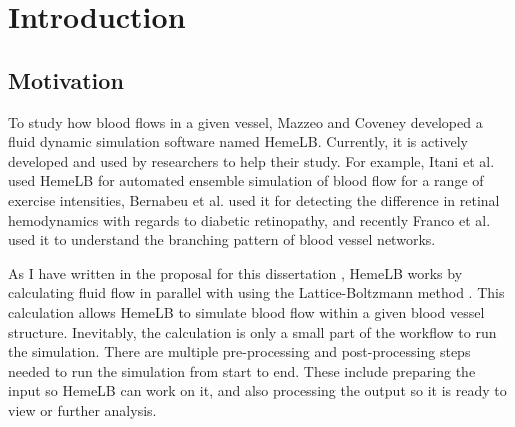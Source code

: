  

\chapter[Introduction]{Introduction}



%


\section{Motivation}
To study how blood flows in a given vessel, Mazzeo and Coveney \cite{mazzeo2008hemelb} developed a fluid dynamic simulation software named HemeLB. Currently, it is actively developed and used by researchers to help their study. For example, Itani et al. \cite{itani2015automated} used HemeLB for automated ensemble simulation of blood flow for a range of exercise intensities,  Bernabeu et al. \cite{bernabeu2015characterization} used it for detecting the difference in retinal hemodynamics with regards to diabetic retinopathy, and recently Franco et al. \cite{franco2015dynamic,franco2016non} used it to understand the branching pattern of blood vessel networks.

As I have written in the proposal for this dissertation \citep{Steven:2016aa}, HemeLB works by calculating fluid flow in parallel with using the Lattice-Boltzmann method \citep{mazzeo2008hemelb}. This calculation allows HemeLB to simulate blood flow within a given blood vessel structure. Inevitably, the calculation is only a small part of the workflow to run the simulation. There are multiple pre-processing and post-processing steps needed to run the simulation from start to end. These include preparing the input so HemeLB can work on it, and also processing the output so it is ready to view or further analysis.

